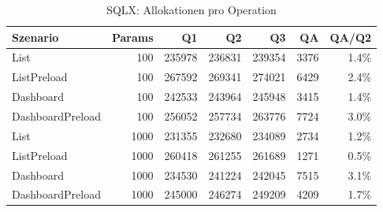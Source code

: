 \begin{table}[ht]
\centering
\caption{SQLX: Allokationen pro Operation}
\begin{tabular}{lrrrrrr}
\toprule
Szenario & Params & Q1 & Q2 & Q3 & QA & QA/Q2 \\
\midrule
		List & 100 & 235978 & 236831 & 239354 & 3376 & 1.4\% \\
		ListPreload & 100 & 267592 & 269341 & 274021 & 6429 & 2.4\% \\
		Dashboard & 100 & 242533 & 243964 & 245948 & 3415 & 1.4\% \\
		DashboardPreload & 100 & 256052 & 257734 & 263776 & 7724 & 3.0\% \\
		List & 1000 & 231355 & 232680 & 234089 & 2734 & 1.2\% \\
		ListPreload & 1000 & 260418 & 261255 & 261689 & 1271 & 0.5\% \\
		Dashboard & 1000 & 234530 & 241224 & 242045 & 7515 & 3.1\% \\
		DashboardPreload & 1000 & 245000 & 246274 & 249209 & 4209 & 1.7\% \\
\bottomrule
\end{tabular}
\label{tab:benchmark_sqlx_allocsperop}
\end{table}
	